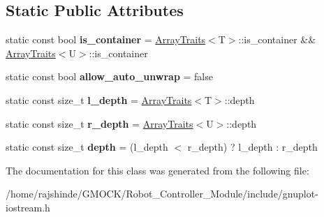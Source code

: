 \subsection*{Static Public Attributes}
\begin{DoxyCompactItemize}
\item 
static const bool {\bfseries is\+\_\+container} = \hyperlink{classgnuplotio_1_1_array_traits}{Array\+Traits}$<$T$>$\+::is\+\_\+container \&\& \hyperlink{classgnuplotio_1_1_array_traits}{Array\+Traits}$<$U$>$\+::is\+\_\+container\hypertarget{classgnuplotio_1_1_array_traits_3_01std_1_1pair_3_01_t_00_01_u_01_4_01_4_a8656ab8094037d88b470f718ff7197e0}{}\label{classgnuplotio_1_1_array_traits_3_01std_1_1pair_3_01_t_00_01_u_01_4_01_4_a8656ab8094037d88b470f718ff7197e0}

\item 
static const bool {\bfseries allow\+\_\+auto\+\_\+unwrap} = false\hypertarget{classgnuplotio_1_1_array_traits_3_01std_1_1pair_3_01_t_00_01_u_01_4_01_4_afff9ebffb39ab8660bb59ffcc7d8a2e5}{}\label{classgnuplotio_1_1_array_traits_3_01std_1_1pair_3_01_t_00_01_u_01_4_01_4_afff9ebffb39ab8660bb59ffcc7d8a2e5}

\item 
static const size\+\_\+t {\bfseries l\+\_\+depth} = \hyperlink{classgnuplotio_1_1_array_traits}{Array\+Traits}$<$T$>$\+::depth\hypertarget{classgnuplotio_1_1_array_traits_3_01std_1_1pair_3_01_t_00_01_u_01_4_01_4_ae8be9661c88a8970da3d87c1afc063dc}{}\label{classgnuplotio_1_1_array_traits_3_01std_1_1pair_3_01_t_00_01_u_01_4_01_4_ae8be9661c88a8970da3d87c1afc063dc}

\item 
static const size\+\_\+t {\bfseries r\+\_\+depth} = \hyperlink{classgnuplotio_1_1_array_traits}{Array\+Traits}$<$U$>$\+::depth\hypertarget{classgnuplotio_1_1_array_traits_3_01std_1_1pair_3_01_t_00_01_u_01_4_01_4_a1b7e7f8976a5d0ed20b93ede3e25a546}{}\label{classgnuplotio_1_1_array_traits_3_01std_1_1pair_3_01_t_00_01_u_01_4_01_4_a1b7e7f8976a5d0ed20b93ede3e25a546}

\item 
static const size\+\_\+t {\bfseries depth} = (l\+\_\+depth $<$ r\+\_\+depth) ? l\+\_\+depth \+: r\+\_\+depth\hypertarget{classgnuplotio_1_1_array_traits_3_01std_1_1pair_3_01_t_00_01_u_01_4_01_4_a11b3be89ac9506fcfcceb318acc7e2bf}{}\label{classgnuplotio_1_1_array_traits_3_01std_1_1pair_3_01_t_00_01_u_01_4_01_4_a11b3be89ac9506fcfcceb318acc7e2bf}

\end{DoxyCompactItemize}


The documentation for this class was generated from the following file\+:\begin{DoxyCompactItemize}
\item 
/home/rajshinde/\+G\+M\+O\+C\+K/\+Robot\+\_\+\+Controller\+\_\+\+Module/include/gnuplot-\/iostream.\+h\end{DoxyCompactItemize}
